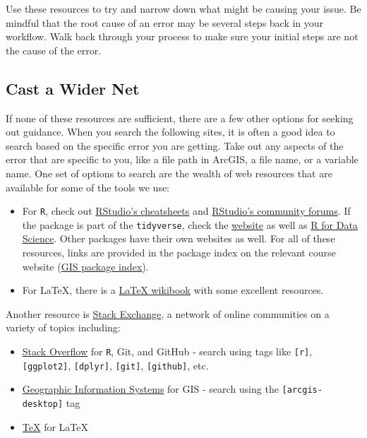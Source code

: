 \documentclass[]{book}
\providecommand{\tightlist}{%
  \setlength{\itemsep}{0pt}\setlength{\parskip}{0pt}}
\theoremstyle{definition}
\theoremstyle{definition}
\theoremstyle{definition}
\theoremstyle{remark}
\begin{document}
Use these resources to try and narrow down what might be causing your
issue. Be mindful that the root cause of an error may be several steps
back in your workflow. Walk back through your process to make sure your
initial steps are not the cause of the error.

\subsection{Cast a Wider Net}\label{cast-a-wider-net}

If none of these resources are sufficient, there are a few other options
for seeking out guidance. When you search the following sites, it is
often a good idea to search based on the specific error you are getting.
Take out any aspects of the error that are specific to you, like a file
path in ArcGIS, a file name, or a variable name. One set of options to
search are the wealth of web resources that are available for some of
the tools we use:

\begin{itemize}
\tightlist
\item
  For \texttt{R}, check out
  \href{https://www.rstudio.com/resources/cheatsheets/}{RStudio's
  cheatsheets} and \href{https://community.rstudio.com}{RStudio's
  community forums}. If the package is part of the \texttt{tidyverse},
  check the \href{http://tidyverse.org}{website} as well as
  \href{http://r4ds.had.co.nz}{R for Data Science}. Other packages have
  their own websites as well. For all of these resources, links are
  provided in the package index on the relevant course website
  (\href{https://slu-soc5650.github.io/package-index/}{GIS package
  index}).
\item
  For LaTeX, there is a \href{https://en.wikibooks.org/wiki/LaTeX}{LaTeX
  wikibook} with some excellent resources.
\end{itemize}

Another resource is \href{https://stackexchange.com}{Stack Exchange}, a
network of online communities on a variety of topics including:

\begin{itemize}
\tightlist
\item
  \href{https://stackoverflow.com}{Stack Overflow} for \texttt{R}, Git,
  and GitHub - search using tags like \texttt{{[}r{]}},
  \texttt{{[}ggplot2{]}}, \texttt{{[}dplyr{]}}, \texttt{{[}git{]}},
  \texttt{{[}github{]}}, etc.
\item
  \href{https://gis.stackexchange.com}{Geographic Information Systems}
  for GIS - search using the \texttt{{[}arcgis-desktop{]}} tag
\item
  \href{https://tex.stackexchange.com}{TeX} for LaTeX
\end{itemize}
\end{document}
